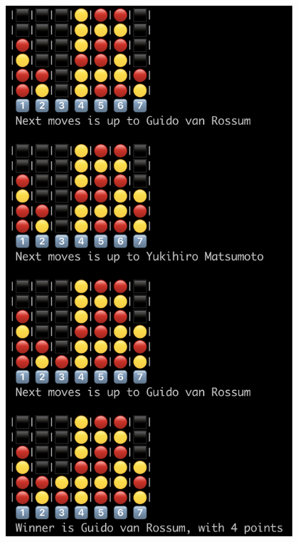 \documentclass[handout]{beamer}
\begin{document}
\begin{frame}
\begin{columns}
        \includegraphics[width=0.8\textwidth]{img/gameend.png}
    \end{columns}
  \end{frame}
\end{document}
